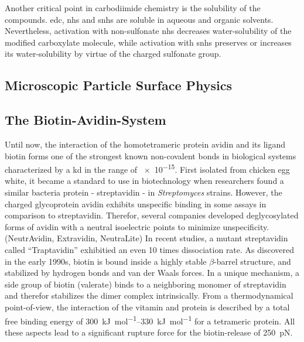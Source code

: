 Another critical point in carbodiimide chemistry is the solubility of the compounds. \gls{edc}, \gls{nhs} and \gls{snhs} are soluble in aqueous and organic solvents. Nevertheless, activation  with  non-sulfonate \gls{nhs} decreases water-solubility of the modified carboxylate molecule, while activation with \gls{snhs} preserves or increases its water-solubility by virtue of the charged sulfonate group. \cite{lit:chem:snhs}

\clearpage

\subsection{Microscopic Particle Surface Physics}


\subsection{The Biotin-Avidin-System}
Until now, the interaction of the homotetrameric protein avidin and its ligand biotin forms one of the strongest known non-covalent bonds in biological systems characterized by a \gls{kd} in the range of \SI{e-15}{\molar}.\cite{lit:bio:biotin:avidin_discovery} First isolated from chicken egg white, it became a standard to use in biotechnology when researchers found a similar bacteria protein - streptavidin - in \textit{Streptomyces} strains.\cite{lit:bio:biotin:discovery} However, the charged glycoprotein avidin exhibits unspecific binding in some assays in comparison to streptavidin. Therefor, several companies developed deglycosylated forms of avidin with a neutral isoelectric points to minimize unspecificity. (NeutrAvidin, Extravidin, NeutraLite) In recent studies, a mutant streptavidin called ``Traptavidin'' exhibitied an even 10 times dissociation rate.\cite{lit:bio:biotin:engStrep}
As discovered in the early 1990s, biotin is bound inside a highly stable $\beta$-barrel structure, and stabilized by hydrogen bonds and van der Waals forces.\cite{lit:bio:biotin:bindingmechanism} In a unique mechanism, a side group of biotin (valerate) binds to a neighboring monomer of streptavidin and therefor stabilizes the dimer complex intrinsically.\cite{lit:bio:biotin:binding,lit:bio:biotin:freeenenergy} From a thermodynamical point-of-view, the interaction of the vitamin and protein is described by a total free binding energy of \SIrange{300}{330}{\kilo\joule\per\mole} for a tetrameric protein. \cite{lit:bio:biotin:freeenenergy}  All these aspects lead to a significant rupture force for the biotin-release of \SI{250}{\pico\newton}.\cite{lit:bio:biotin:rupture}

